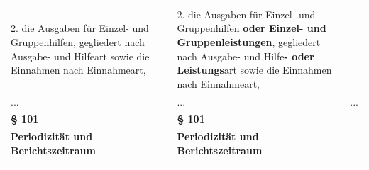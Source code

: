 \documentclass[10pt,a4paper,landscape]{article}
\begin{document}
\begin{longtable}{|L{8.2cm}|L{8.2cm}|L{8.2cm}|}
2.   \newline die Ausgaben für Einzel- und  \newline Gruppenhilfen, gegliedert nach Ausgabe-  \newline und Hilfeart sowie die Einnahmen nach  \newline Einnahmeart, & 2.   \newline die Ausgaben für Einzel- und  \newline Gruppenhilfen \textbf{\textcolor{diffred}{oder Einzel- und  \newline Gruppenleistungen}}, gegliedert nach  \newline Ausgabe- und Hilfe\textbf{\textcolor{diffred}{- oder}} \textbf{\textcolor{diffred}{Leistungs}}art  \newline sowie die Einnahmen nach Einnahmeart, &  \\
\hhline{|---|}
... & ... & ... \\
\hhline{|---|}
\textbf{\S{} 101} & \textbf{\S{} 101} &  \\
\hhline{|---|}
\textbf{Periodizität und Berichtszeitraum} & \textbf{Periodizität und Berichtszeitraum} &  \\
\hhline{|---|}

\end{longtable}
\end{document}
